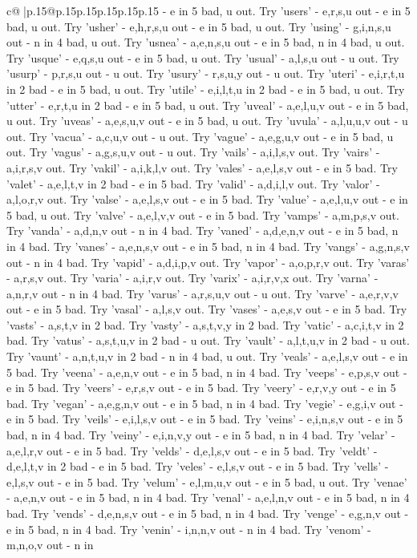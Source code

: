 \documentclass{article}
\begin{document}
{\begin{supertabular}{c@{$\;$}|p{.15\linewidth}@{}p{.15\linewidth}p{.15\linewidth}p{.15\linewidth}p{.15\linewidth}p{.15\linewidth}}
{{{{-} e in 5 bad, u out. Try 'users' {-} e,r,s,u out {-} e in 5 bad, u out. Try 'usher' {-} e,h,r,s,u out {-} e in 5 bad, u out. Try 'using' {-} g,i,n,s,u out {-} n in 4 bad, u out. Try 'usnea' {-} a,e,n,s,u out {-} e in 5 bad, n in 4 bad, u out. Try 'usque' {-} e,q,s,u out {-} e in 5 bad, u out. Try 'usual' {-} a,l,s,u out {-} u out. Try 'usurp' {-} p,r,s,u out {-} u out. Try 'usury' {-} r,s,u,y out {-} u out. Try 'uteri' {-} e,i,r,t,u in 2 bad {-} e in 5 bad, u out. Try 'utile' {-} e,i,l,t,u in 2 bad {-} e in 5 bad, u out. Try 'utter' {-} e,r,t,u in 2 bad {-} e in 5 bad, u out. Try 'uveal' {-} a,e,l,u,v out {-} e in 5 bad, u out. Try 'uveas' {-} a,e,s,u,v out {-} e in 5 bad, u out. Try 'uvula' {-} a,l,u,u,v out {-} u out. Try 'vacua' {-} a,c,u,v out {-} u out. Try 'vague' {-} a,e,g,u,v out {-} e in 5 bad, u out. Try 'vagus' {-} a,g,s,u,v out {-} u out. Try 'vails' {-} a,i,l,s,v out. Try 'vairs' {-} a,i,r,s,v out. Try 'vakil' {-} a,i,k,l,v out. Try 'vales' {-} a,e,l,s,v out {-} e in 5 bad. Try 'valet' {-} a,e,l,t,v in 2 bad {-} e in 5 bad. Try 'valid' {-} a,d,i,l,v out. Try 'valor' {-} a,l,o,r,v out. Try 'valse' {-} a,e,l,s,v out {-} e in 5 bad. Try 'value' {-} a,e,l,u,v out {-} e in 5 bad, u out. Try 'valve' {-} a,e,l,v,v out {-} e in 5 bad. Try 'vamps' {-} a,m,p,s,v out. Try 'vanda' {-} a,d,n,v out {-} n in 4 bad. Try 'vaned' {-} a,d,e,n,v out {-} e in 5 bad, n in 4 bad. Try 'vanes' {-} a,e,n,s,v out {-} e in 5 bad, n in 4 bad. Try 'vangs' {-} a,g,n,s,v out {-} n in 4 bad. Try 'vapid' {-} a,d,i,p,v out. Try 'vapor' {-} a,o,p,r,v out. Try 'varas' {-} a,r,s,v out. Try 'varia' {-} a,i,r,v out. Try 'varix' {-} a,i,r,v,x out. Try 'varna' {-} a,n,r,v out {-} n in 4 bad. Try 'varus' {-} a,r,s,u,v out {-} u out. Try 'varve' {-} a,e,r,v,v out {-} e in 5 bad. Try 'vasal' {-} a,l,s,v out. Try 'vases' {-} a,e,s,v out {-} e in 5 bad. Try 'vasts' {-} a,s,t,v in 2 bad. Try 'vasty' {-} a,s,t,v,y in 2 bad. Try 'vatic' {-} a,c,i,t,v in 2 bad. Try 'vatus' {-} a,s,t,u,v in 2 bad {-} u out. Try 'vault' {-} a,l,t,u,v in 2 bad {-} u out. Try 'vaunt' {-} a,n,t,u,v in 2 bad {-} n in 4 bad, u out. Try 'veals' {-} a,e,l,s,v out {-} e in 5 bad. Try 'veena' {-} a,e,n,v out {-} e in 5 bad, n in 4 bad. Try 'veeps' {-} e,p,s,v out {-} e in 5 bad. Try 'veers' {-} e,r,s,v out {-} e in 5 bad. Try 'veery' {-} e,r,v,y out {-} e in 5 bad. Try 'vegan' {-} a,e,g,n,v out {-} e in 5 bad, n in 4 bad. Try 'vegie' {-} e,g,i,v out {-} e in 5 bad. Try 'veils' {-} e,i,l,s,v out {-} e in 5 bad. Try 'veins' {-} e,i,n,s,v out {-} e in 5 bad, n in 4 bad. Try 'veiny' {-} e,i,n,v,y out {-} e in 5 bad, n in 4 bad. Try 'velar' {-} a,e,l,r,v out {-} e in 5 bad. Try 'velds' {-} d,e,l,s,v out {-} e in 5 bad. Try 'veldt' {-} d,e,l,t,v in 2 bad {-} e in 5 bad. Try 'veles' {-} e,l,s,v out {-} e in 5 bad. Try 'vells' {-} e,l,s,v out {-} e in 5 bad. Try 'velum' {-} e,l,m,u,v out {-} e in 5 bad, u out. Try 'venae' {-} a,e,n,v out {-} e in 5 bad, n in 4 bad. Try 'venal' {-} a,e,l,n,v out {-} e in 5 bad, n in 4 bad. Try 'vends' {-} d,e,n,s,v out {-} e in 5 bad, n in 4 bad. Try 'venge' {-} e,g,n,v out {-} e in 5 bad, n in 4 bad. Try 'venin' {-} i,n,n,v out {-} n in 4 bad. Try 'venom' {-} m,n,o,v out {-} n in }}}
\end{supertabular}}
\end{document}
